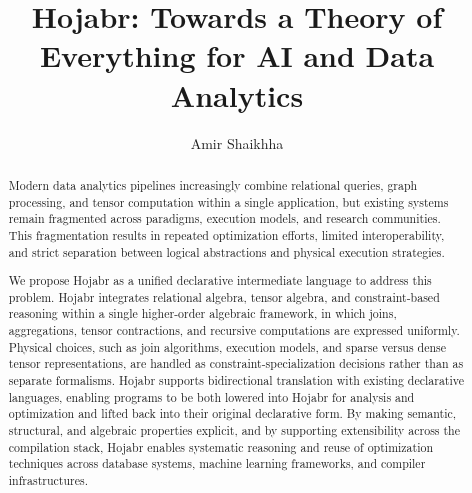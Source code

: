 \documentclass[sigconf,nonacm]{acmart}
\begin{document}
\title{Hojabr: Towards a Theory of Everything for AI and Data Analytics}

\author{Amir Shaikhha}




\begin{abstract}
Modern data analytics pipelines increasingly combine relational queries, graph processing, and tensor computation within a single application, but existing systems remain fragmented across paradigms, execution models, and research communities. This fragmentation results in repeated optimization efforts, limited interoperability, and strict separation between logical abstractions and physical execution strategies. 

We propose Hojabr as a unified declarative intermediate language to address this problem. Hojabr integrates relational algebra, tensor algebra, and constraint-based reasoning within a single higher-order algebraic framework, in which joins, aggregations, tensor contractions, and recursive computations are expressed uniformly. Physical choices, such as join algorithms, execution models, and sparse versus dense tensor representations, are handled as constraint-specialization decisions rather than as separate formalisms. Hojabr supports bidirectional translation with existing declarative languages, enabling programs to be both lowered into Hojabr for analysis and optimization and lifted back into their original declarative form. By making semantic, structural, and algebraic properties explicit, and by supporting extensibility across the compilation stack, Hojabr enables systematic reasoning and reuse of optimization techniques across database systems, machine learning frameworks, and compiler infrastructures.
\end{abstract}
\end{document}
